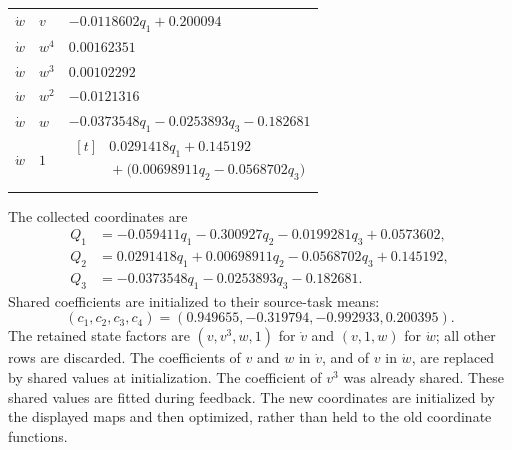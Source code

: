 \begin{longtable}{@{}p{1.2cm}p{2cm}p{11.5cm}@{}}
$\dot w$ & $v$ & $- 0.0118602 q_{1} + 0.200094$\\
$\dot w$ & $w^{4}$ & $0.00162351$\\
$\dot w$ & $w^{3}$ & $0.00102292$\\
$\dot w$ & $w^{2}$ & $-0.0121316$\\
$\dot w$ & $w$ & $- 0.0373548 q_{1} - 0.0253893 q_{3} - 0.182681$\\
$\dot w$ & $1$ & $\begin{aligned}[t]&0.0291418 q_{1} + 0.145192\\&{}+\bigl(0.00698911 q_{2} - 0.0568702 q_{3}\bigr)\end{aligned}$\\
\addlinespace
\end{longtable}
\endgroup
\noindent The collected coordinates are
\begin{align*}
Q_1&=- 0.059411 q_{1} - 0.300927 q_{2} - 0.0199281 q_{3} + 0.0573602,\\
Q_2&=0.0291418 q_{1} + 0.00698911 q_{2} - 0.0568702 q_{3} + 0.145192,\\
Q_3&=- 0.0373548 q_{1} - 0.0253893 q_{3} - 0.182681.
\end{align*}
\noindent Shared coefficients are initialized to their source-task means:
\[
(c_1,c_2,c_3,c_4)=(0.949655,-0.319794,-0.992933,0.200395).
\]
The retained state factors are $(v,v^3,w,1)$ for $\dot v$ and $(v,1,w)$ for $\dot w$; all other rows are discarded. The coefficients of $v$ and $w$ in $\dot v$, and of $v$ in $\dot w$, are replaced by shared values at initialization. The coefficient of $v^3$ was already shared.
These shared values are fitted during feedback. The new coordinates are initialized by the displayed maps and then optimized, rather than held to the old coordinate functions.
\begingroup\small
\setlength{\tabcolsep}{5pt}
